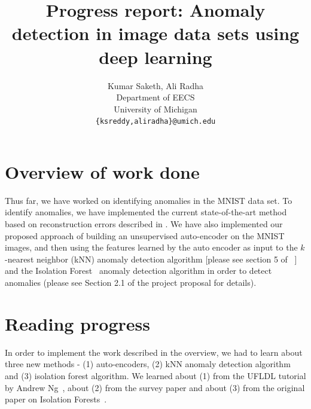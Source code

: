 \documentclass[10pt,twocolumn,letterpaper]{article}
\begin{document}
\title{Progress report: Anomaly detection in image data sets using deep learning}

\author{Kumar Saketh, Ali Radha\\
Department of EECS\\
University of Michigan\\
{\tt\small \{ksreddy,aliradha\}@umich.edu}
}

\maketitle

\section{Overview of work done}
Thus far, we have worked on identifying anomalies in the MNIST data set. To identify anomalies, we have implemented the current state-of-the-art method based on reconstruction errors described in \cite{h2o}. We have also implemented our proposed approach of building an unsupervised auto-encoder on the MNIST images, and then using the features learned by the auto encoder as input to the $k$-nearest neighbor (kNN) anomaly detection algorithm [please see section 5 of ~\cite{adsurvey}] and the Isolation Forest~\cite{iforest} anomaly detection algorithm in order to detect anomalies (please see Section 2.1 of the project proposal for details).

\section{Reading progress}
In order to implement the work described in the overview, we had to learn about three new methods - (1) auto-encoders, (2) kNN anomaly detection algorithm and (3) isolation forest algorithm. We learned about (1) from the UFLDL tutorial by Andrew Ng~\cite{ufldl}, about (2) from the survey paper \cite{adsurvey} and about (3) from the original paper on Isolation Forests~\cite{iforest}.
\end{document}
